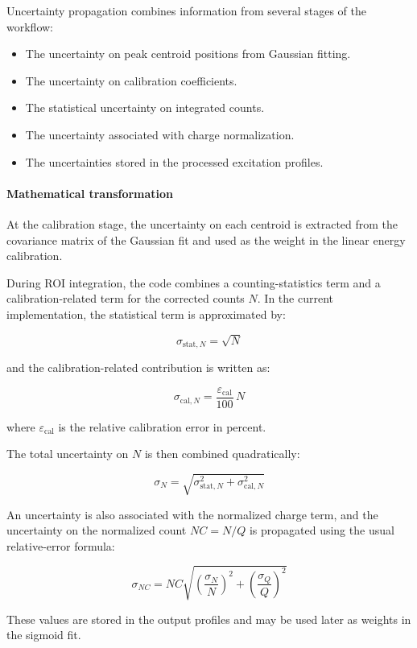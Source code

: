 Uncertainty propagation combines information from several stages of the
workflow:

\begin{itemize}
\tightlist
\item
  The uncertainty on peak centroid positions from Gaussian fitting.
\item
  The uncertainty on calibration coefficients.
\item
  The statistical uncertainty on integrated counts.
\item
  The uncertainty associated with charge normalization.
\item
  The uncertainties stored in the processed excitation profiles.
\end{itemize}

\hypertarget{mathematical-transformation-5}{%
\paragraph{Mathematical
transformation}\label{mathematical-transformation-5}}

At the calibration stage, the uncertainty on each centroid is extracted
from the covariance matrix of the Gaussian fit and used as the weight in
the linear energy calibration.

During ROI integration, the code combines a counting-statistics term and
a calibration-related term for the corrected counts \(N\). In the
current implementation, the statistical term is approximated by:

\[
\sigma_{\mathrm{stat},N} = \sqrt{N}
\]

and the calibration-related contribution is written as:

\[
\sigma_{\mathrm{cal},N} = \frac{\varepsilon_{\mathrm{cal}}}{100}\,N
\]

where \(\varepsilon_{\mathrm{cal}}\) is the relative calibration error
in percent.

The total uncertainty on \(N\) is then combined quadratically:

\[
\sigma_N = \sqrt{\sigma_{\mathrm{stat},N}^2 + \sigma_{\mathrm{cal},N}^2}
\]

An uncertainty is also associated with the normalized charge term, and
the uncertainty on the normalized count \(NC=N/Q\) is propagated using
the usual relative-error formula:

\[
\sigma_{NC} = NC \sqrt{\left(\frac{\sigma_N}{N}\right)^2 + \left(\frac{\sigma_Q}{Q}\right)^2}
\]

These values are stored in the output profiles and may be used later as
weights in the sigmoid fit.

